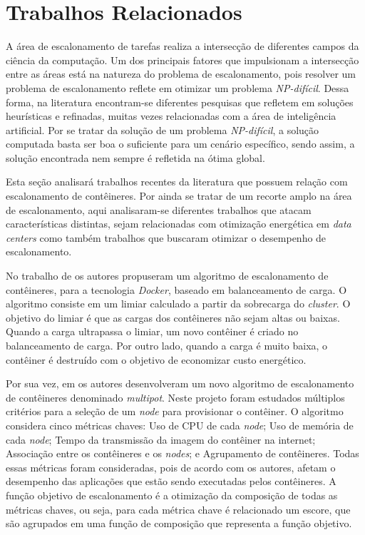 \section{Trabalhos Relacionados}

A área de escalonamento de tarefas realiza a intersecção de diferentes campos da ciência da computação. Um dos principais fatores que impulsionam a intersecção entre as áreas está na natureza do problema de escalonamento, pois resolver um problema de escalonamento reflete em otimizar um problema \textit{NP-difícil}. Dessa forma, na literatura encontram-se diferentes pesquisas que refletem em soluções heurísticas e refinadas, muitas vezes relacionadas com a área de inteligência artificial. Por se tratar da solução de um problema \textit{NP-difícil}, a solução computada basta ser boa o suficiente para um cenário específico, sendo assim, a solução encontrada nem sempre é refletida na ótima global.

Esta seção analisará trabalhos recentes da literatura que possuem relação com escalonamento de contêineres. Por ainda se tratar de um recorte amplo na área de escalonamento, aqui analisaram-se diferentes trabalhos que atacam características distintas, sejam relacionadas com otimização energética em \textit{data centers} como também trabalhos que buscaram otimizar o desempenho de escalonamento.

No trabalho de  os autores propuseram um algoritmo de escalonamento de contêineres, para a tecnologia \textit{Docker}, baseado em balanceamento de carga. O algoritmo consiste em um limiar calculado a partir da sobrecarga do \textit{cluster}.
O objetivo do limiar é que as cargas dos contêineres não sejam altas ou baixas. Quando a carga ultrapassa o limiar, um novo contêiner é criado no balanceamento de carga. Por outro lado, quando a carga é muito baixa, o contêiner é destruído com o objetivo de economizar custo energético.

Por sua vez, em  os autores desenvolveram um novo algoritmo de escalonamento de contêineres denominado \textit{multipot}. Neste projeto foram estudados múltiplos critérios para a seleção de um \textit{node} para provisionar o contêiner. O algoritmo considera cinco métricas chaves: Uso de CPU de cada \textit{node}; Uso de memória de cada \textit{node}; Tempo da transmissão da imagem do contêiner na internet; Associação entre os contêineres e os \textit{nodes}; e Agrupamento de contêineres.
%
Todas essas métricas foram consideradas, pois de acordo com os autores, afetam o desempenho das aplicações que estão sendo executadas pelos contêineres. A função objetivo de escalonamento é a otimização da composição de todas as métricas chaves, ou seja, para cada métrica chave é relacionado um escore, que são agrupados em uma função de composição que representa a função objetivo.


